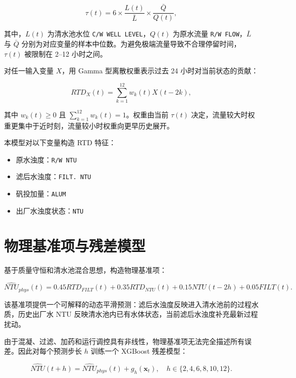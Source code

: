 \documentclass[UTF8,a4paper,12pt]{ctexart}
\begin{document}
\begin{equation}
\tau(t)=6 \times \frac{L(t)}{\bar L} \times \frac{\bar Q}{Q(t)},
\end{equation}

其中，$L(t)$ 为清水池水位 \texttt{C/W WELL LEVEL}，$Q(t)$ 为原水流量 \texttt{R/W FLOW}，$\bar L$ 与 $\bar Q$ 分别为对应变量的样本中位数。为避免极端流量导致不合理停留时间，$\tau(t)$ 被限制在 2--12 小时之间。

对任一输入变量 $X$，用 Gamma 型离散权重表示过去 24 小时对当前状态的贡献：

\begin{equation}
RTD_X(t)=\sum_{k=1}^{12} w_k(t)X(t-2k),
\end{equation}

其中 $w_k(t)\ge 0$ 且 $\sum_{k=1}^{12}w_k(t)=1$。权重由当前 $\tau(t)$ 决定，流量较大时权重更集中于近时刻，流量较小时权重向更早历史展开。

本模型对以下变量构造 RTD 特征：

\begin{itemize}
  \item 原水浊度：\texttt{R/W NTU}
  \item 滤后水浊度：\texttt{FILT. NTU}
  \item 矾投加量：\texttt{ALUM}
  \item 出厂水浊度状态：\texttt{NTU}
\end{itemize}

\section{物理基准项与残差模型}

基于质量守恒和清水池混合思想，构造物理基准项：

\begin{equation}
\widehat{NTU}_{phys}(t)
=0.45RTD_{FILT}(t)
+0.35RTD_{NTU}(t)
+0.15NTU(t-2h)
+0.05FILT(t).
\end{equation}

该基准项提供一个可解释的动态平滑预测：滤后水浊度反映进入清水池前的过程水质，历史出厂水 NTU 反映清水池内已有水体状态，当前滤后水浊度补充最新过程扰动。

由于混凝、过滤、加药和运行调控具有非线性，物理基准项无法完全描述所有误差。因此对每个预测步长 $h$ 训练一个 XGBoost 残差模型：

\begin{equation}
\widehat{NTU}(t+h)=\widehat{NTU}_{phys}(t)+g_h(\mathbf{x}_t),
\quad h\in\{2,4,6,8,10,12\}.
\end{equation}
\end{document}
